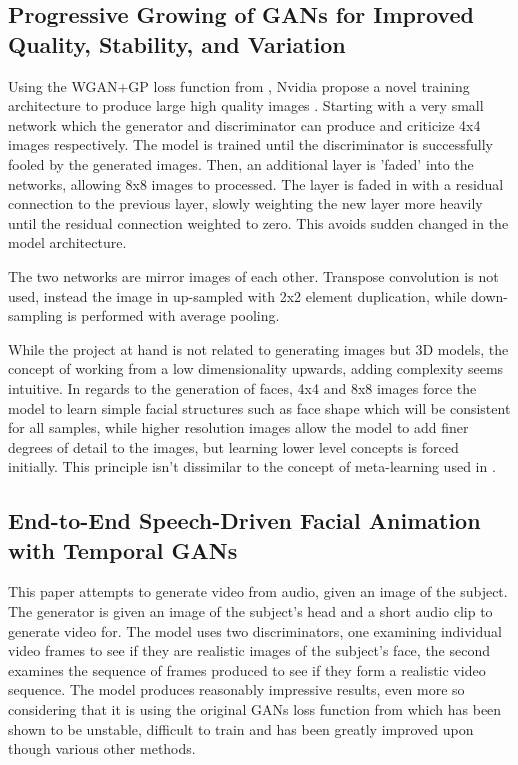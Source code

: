 \documentclass[12pt]{article}
\begin{document}
\subsection{Progressive Growing of GANs for Improved Quality, Stability, and Variation}
Using the WGAN+GP loss function from \cite{Gulrajani2017}, Nvidia propose a novel training architecture to produce large high quality images \cite{Karras2017b}.
Starting with a very small network which the generator and discriminator can produce and criticize 4x4 images respectively. 
The model is trained until the discriminator is successfully fooled by the generated images.
Then, an additional layer is 'faded' into the networks, allowing 8x8 images to processed.
The layer is faded in with a residual connection to the previous layer, slowly weighting the new layer more heavily until the residual connection weighted to zero. 
This avoids sudden changed in the model architecture.

The two networks are mirror images of each other.
Transpose convolution is not used, instead the image in up-sampled with 2x2 element duplication, while down-sampling is performed with average pooling.

While the project at hand is not related to generating images but 3D models, the concept of working from a low dimensionality upwards, adding complexity seems intuitive. 
In regards to the generation of faces, 4x4 and 8x8 images force the model to learn simple facial structures such as face shape which will be consistent for all samples, while higher resolution images allow the model to add finer degrees of detail to the images, but learning lower level concepts is forced initially.
This principle isn't dissimilar to the concept of meta-learning used in \cite{Zakharov2019}.

\subsection{End-to-End Speech-Driven Facial Animation with Temporal GANs}
This paper \cite{Vougioukas2018} attempts to generate video from audio, given an image of the subject.
The generator is given an image of the subject's head and a short audio clip to generate video for.
The model uses two discriminators, one examining individual video frames to see if they are realistic images of the subject's face, the second examines the sequence of frames produced to see if they form a realistic video sequence.
The model produces reasonably impressive results, even more so considering that it is using the original GANs loss function from \cite{Goodfellow2014} which has been shown to be unstable, difficult to train and has been greatly improved upon though various other methods.
\end{document}
